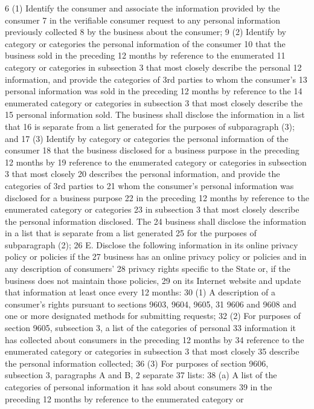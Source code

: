 6 (1) Identify the consumer and associate the information provided by the consumer
7 in the verifiable consumer request to any personal information previously collected
8 by the business about the consumer;
9 (2) Identify by category or categories the personal information of the consumer
10 that the business sold in the preceding 12 months by reference to the enumerated
11 category or categories in subsection 3 that most closely describe the personal
12 information, and provide the categories of 3rd parties to whom the consumer's
13 personal information was sold in the preceding 12 months by reference to the
14 enumerated category or categories in subsection 3 that most closely describe the
15 personal information sold. The business shall disclose the information in a list that
16 is separate from a list generated for the purposes of subparagraph (3); and
17 (3) Identify by category or categories the personal information of the consumer
18 that the business disclosed for a business purpose in the preceding 12 months by
19 reference to the enumerated category or categories in subsection 3 that most closely
20 describes the personal information, and provide the categories of 3rd parties to
21 whom the consumer's personal information was disclosed for a business purpose
22 in the preceding 12 months by reference to the enumerated category or categories
23 in subsection 3 that most closely describe the personal information disclosed. The
24 business shall disclose the information in a list that is separate from a list generated
25 for the purposes of subparagraph (2);
26 E. Disclose the following information in its online privacy policy or policies if the
27 business has an online privacy policy or policies and in any description of consumers'
28 privacy rights specific to the State or, if the business does not maintain those policies,
29 on its Internet website and update that information at least once every 12 months:
30 (1) A description of a consumer's rights pursuant to sections 9603, 9604, 9605,
31 9606 and 9608 and one or more designated methods for submitting requests;
32 (2) For purposes of section 9605, subsection 3, a list of the categories of personal
33 information it has collected about consumers in the preceding 12 months by
34 reference to the enumerated category or categories in subsection 3 that most closely
35 describe the personal information collected;
36 (3) For purposes of section 9606, subsection 3, paragraphs A and B, 2 separate
37 lists:
38 (a) A list of the categories of personal information it has sold about consumers
39 in the preceding 12 months by reference to the enumerated category or
